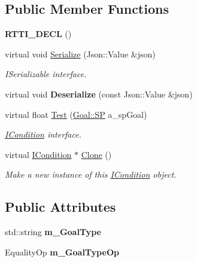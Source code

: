 \subsection*{Public Member Functions}
\begin{DoxyCompactItemize}
\item 
\mbox{\label{struct_goal_type_condition_a090e5a43d4809ddc48485dd2b54561eb}} 
{\bfseries R\+T\+T\+I\+\_\+\+D\+E\+CL} ()
\item 
\mbox{\label{struct_goal_type_condition_a6c9f8c0dbdc4990d618c47771b3c5696}} 
virtual void \hyperlink{struct_goal_type_condition_a6c9f8c0dbdc4990d618c47771b3c5696}{Serialize} (Json\+::\+Value \&json)
\begin{DoxyCompactList}\small\item\em I\+Serializable interface. \end{DoxyCompactList}\item 
\mbox{\label{struct_goal_type_condition_a0b3faffa41e30688fa1523737cc90d6f}} 
virtual void {\bfseries Deserialize} (const Json\+::\+Value \&json)
\item 
\mbox{\label{struct_goal_type_condition_aa52cd4e208ed256e063d339ab967e610}} 
virtual float \hyperlink{struct_goal_type_condition_aa52cd4e208ed256e063d339ab967e610}{Test} (\hyperlink{class_goal_a818ae12a4d1f28bd433dab2a830a390e}{Goal\+::\+SP} a\+\_\+sp\+Goal)
\begin{DoxyCompactList}\small\item\em \hyperlink{class_i_condition}{I\+Condition} interface. \end{DoxyCompactList}\item 
\mbox{\label{struct_goal_type_condition_a8dc1a0235b7f1ac29011641c206d19bc}} 
virtual \hyperlink{class_i_condition}{I\+Condition} $\ast$ \hyperlink{struct_goal_type_condition_a8dc1a0235b7f1ac29011641c206d19bc}{Clone} ()
\begin{DoxyCompactList}\small\item\em Make a new instance of this \hyperlink{class_i_condition}{I\+Condition} object. \end{DoxyCompactList}\end{DoxyCompactItemize}
\subsection*{Public Attributes}
\begin{DoxyCompactItemize}
\item 
\mbox{\label{struct_goal_type_condition_a6ef50820f05128c9868a055dfa08a8d5}} 
std\+::string {\bfseries m\+\_\+\+Goal\+Type}
\item 
\mbox{\label{struct_goal_type_condition_a574d9744c1c6b93842d8b3c347d6d45c}} 
Equality\+Op {\bfseries m\+\_\+\+Goal\+Type\+Op}
\end{DoxyCompactItemize}
